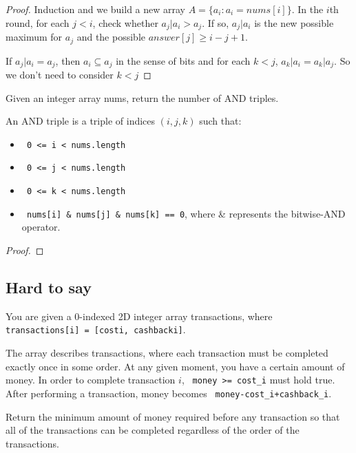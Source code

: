\documentclass[11pt]{article}
\let\OldTexttt\texttt
\renewcommand{\texttt}[1]{\OldTexttt{\color{MidnightBlue} #1}}
\begin{document}
\begin{proof}
Induction and we build a new array \(A=\{a_i:a_i=nums[i]\}\). In the \(i\)th round, for
each \(j<i\), check whether \(a_j|a_i>a_j\). If so, \(a_j|a_i\) is the new possible maximum
for \(a_j\) and the possible \(answer[j]\ge i-j+1\).

If \(a_j|a_i=a_j\), then \(a_i\subseteq a_j\) in the sense of bits and for
each \(k<j\), \(a_k|a_i=a_k|a_j\). So we don't need to consider \(k<j\)
\end{proof}

\begin{problem}
Given an integer array nums, return the number of AND triples.

An AND triple is a triple of indices \((i, j, k)\) such that:
\begin{itemize}
\item \texttt{0 <= i < nums.length}
\item \texttt{0 <= j < nums.length}
\item \texttt{0 <= k < nums.length}
\item \texttt{nums[i] \& nums[j] \& nums[k] == 0}, where \& represents the bitwise-AND operator.
\end{itemize}
\end{problem}

\begin{proof}

\end{proof}

\subsection{Hard to say}
\label{sec:org6cd8756}
\begin{problem}
You are given a 0-indexed 2D integer array transactions, where \texttt{transactions[i] = [costi, cashbacki]}.

The array describes transactions, where each transaction must be completed exactly once in some
order. At any given moment, you have a certain amount of money. In order to complete transaction
\(i\), \texttt{money >= cost\_i} must hold true. After performing a transaction, money becomes \texttt{money-cost\_i+cashback\_i}.

Return the minimum amount of money required before any transaction so that all of the
transactions can be completed regardless of the order of the transactions.
\end{problem}
\end{document}
